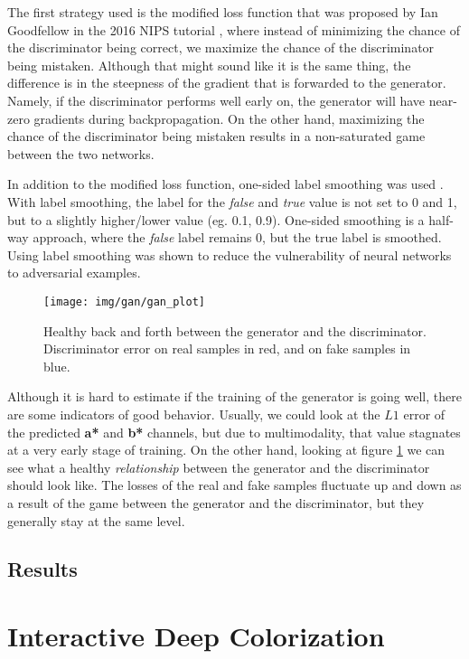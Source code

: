 The first strategy used is the modified loss function that was proposed by Ian Goodfellow
in the 2016 NIPS tutorial \citep{goodfellow2017nips}, where instead of minimizing 
the chance of the discriminator being correct, we maximize the chance of the discriminator 
being mistaken. Although that might sound like it is the same thing, the difference 
is in the steepness of the gradient that is forwarded to the generator. Namely, if the 
discriminator performs well early on, the generator will have near-zero gradients
during backpropagation. On the other hand, maximizing the chance of the discriminator
being mistaken results in a non-saturated game between the two networks.

In addition to the modified loss function, one-sided label smoothing was used 
\citep{salimans2016improved_gans}. With label smoothing, the label for the \textit{false} and 
\textit{true} value is not set to 0 and 1, but to a slightly higher/lower value (eg. 0.1, 0.9). 
One-sided smoothing is a half-way approach, where the \textit{false} label remains 0, but the 
true label is smoothed. Using label smoothing was shown to reduce the vulnerability of 
neural networks to adversarial examples.

\begin{figure}[!ht]
	\centering
	\texttt{[image: img/gan/gan\_plot]}
    \caption{Healthy back and forth between the generator and the discriminator. 
	Discriminator error on real samples in red, and on fake samples in blue.}
	\label{fig:gan_plot}
\end{figure}

Although it is hard to estimate if the training of the generator is going well, there 
are some indicators of good behavior. Usually, we could look at the $L1$ error of 
the predicted \textbf{a*} and \textbf{b*} channels, but due to multimodality, that 
value stagnates at a very early stage of training. On the other hand, looking at 
figure \ref{fig:gan_plot} we can see what a healthy \textit{relationship} between
the generator and the discriminator should look like. The losses of the real and fake 
samples fluctuate up and down as a result of the game between the generator and 
the discriminator, but they generally stay at the same level.

\subsection{Results}

\clearpage
\section{Interactive Deep Colorization}
\label{sec:ideep}

